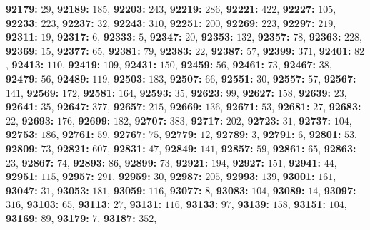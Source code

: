 \textsf{\bfseries 92179:} $29$, \textsf{\bfseries 92189:} $185$, \textsf{\bfseries 92203:} $243$, \textsf{\bfseries 92219:} $286$, \textsf{\bfseries 92221:} $422$, \textsf{\bfseries 92227:} $105$, \textsf{\bfseries 92233:} $223$, \textsf{\bfseries 92237:} $32$, \textsf{\bfseries 92243:} $310$, \textsf{\bfseries 92251:} $200$, \textsf{\bfseries 92269:} $223$, \textsf{\bfseries 92297:} $219$, \textsf{\bfseries 92311:} $19$, \textsf{\bfseries 92317:} $6$, \textsf{\bfseries 92333:} $5$, \textsf{\bfseries 92347:} $20$, \textsf{\bfseries 92353:} $132$, \textsf{\bfseries 92357:} $78$, \textsf{\bfseries 92363:} $228$, \textsf{\bfseries 92369:} $15$, \textsf{\bfseries 92377:} $65$, \textsf{\bfseries 92381:} $79$, \textsf{\bfseries 92383:} $22$, \textsf{\bfseries 92387:} $57$, \textsf{\bfseries 92399:} $371$, \textsf{\bfseries 92401:} $82$, \textsf{\bfseries 92413:} $110$, \textsf{\bfseries 92419:} $109$, \textsf{\bfseries 92431:} $150$, \textsf{\bfseries 92459:} $56$, \textsf{\bfseries 92461:} $73$, \textsf{\bfseries 92467:} $38$, \textsf{\bfseries 92479:} $56$, \textsf{\bfseries 92489:} $119$, \textsf{\bfseries 92503:} $183$, \textsf{\bfseries 92507:} $66$, \textsf{\bfseries 92551:} $30$, \textsf{\bfseries 92557:} $57$, \textsf{\bfseries 92567:} $141$, \textsf{\bfseries 92569:} $172$, \textsf{\bfseries 92581:} $164$, \textsf{\bfseries 92593:} $35$, \textsf{\bfseries 92623:} $99$, \textsf{\bfseries 92627:} $158$, \textsf{\bfseries 92639:} $23$, \textsf{\bfseries 92641:} $35$, \textsf{\bfseries 92647:} $377$, \textsf{\bfseries 92657:} $215$, \textsf{\bfseries 92669:} $136$, \textsf{\bfseries 92671:} $53$, \textsf{\bfseries 92681:} $27$, \textsf{\bfseries 92683:} $22$, \textsf{\bfseries 92693:} $176$, \textsf{\bfseries 92699:} $182$, \textsf{\bfseries 92707:} $383$, \textsf{\bfseries 92717:} $202$, \textsf{\bfseries 92723:} $31$, \textsf{\bfseries 92737:} $104$, \textsf{\bfseries 92753:} $186$, \textsf{\bfseries 92761:} $59$, \textsf{\bfseries 92767:} $75$, \textsf{\bfseries 92779:} $12$, \textsf{\bfseries 92789:} $3$, \textsf{\bfseries 92791:} $6$, \textsf{\bfseries 92801:} $53$, \textsf{\bfseries 92809:} $73$, \textsf{\bfseries 92821:} $607$, \textsf{\bfseries 92831:} $47$, \textsf{\bfseries 92849:} $141$, \textsf{\bfseries 92857:} $59$, \textsf{\bfseries 92861:} $65$, \textsf{\bfseries 92863:} $23$, \textsf{\bfseries 92867:} $74$, \textsf{\bfseries 92893:} $86$, \textsf{\bfseries 92899:} $73$, \textsf{\bfseries 92921:} $194$, \textsf{\bfseries 92927:} $151$, \textsf{\bfseries 92941:} $44$, \textsf{\bfseries 92951:} $115$, \textsf{\bfseries 92957:} $291$, \textsf{\bfseries 92959:} $30$, \textsf{\bfseries 92987:} $205$, \textsf{\bfseries 92993:} $139$, \textsf{\bfseries 93001:} $161$, \textsf{\bfseries 93047:} $31$, \textsf{\bfseries 93053:} $181$, \textsf{\bfseries 93059:} $116$, \textsf{\bfseries 93077:} $8$, \textsf{\bfseries 93083:} $104$, \textsf{\bfseries 93089:} $14$, \textsf{\bfseries 93097:} $316$, \textsf{\bfseries 93103:} $65$, \textsf{\bfseries 93113:} $27$, \textsf{\bfseries 93131:} $116$, \textsf{\bfseries 93133:} $97$, \textsf{\bfseries 93139:} $158$, \textsf{\bfseries 93151:} $104$, \textsf{\bfseries 93169:} $89$, \textsf{\bfseries 93179:} $7$, \textsf{\bfseries 93187:} $352$, 

